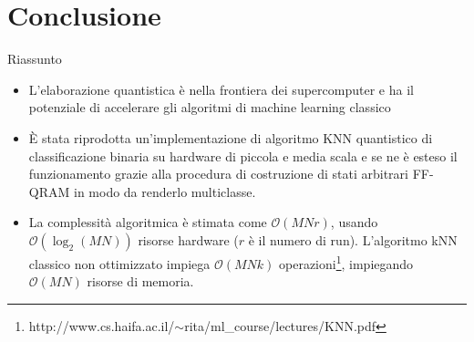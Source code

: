 \documentclass{beamer}
\begin{document}
    \section{Conclusione}

    \begin{frame}{Riassunto}
        \begin{itemize}
            \item L'elaborazione quantistica è nella frontiera dei supercomputer e ha il potenziale di accelerare gli algoritmi di machine learning classico
            \item È stata riprodotta un'implementazione di algoritmo KNN quantistico di classificazione binaria su hardware di piccola e media scala e 
            se ne è esteso il funzionamento grazie alla procedura di costruzione di stati arbitrari FF-QRAM in modo da renderlo multiclasse. 
            \item La complessità algoritmica è stimata come $\mathcal{O}(MNr)$, usando $\mathcal{O}(\log_2(MN))$ risorse hardware ($r$ è il numero di run). 
            L'algoritmo kNN classico non ottimizzato impiega $\mathcal{O}(MNk)$ operazioni\footnote{http://www.cs.haifa.ac.il/$\sim$rita/ml\_course/lectures/KNN.pdf}, impiegando $\mathcal{O}(MN)$ risorse di memoria. 
        \end{itemize}
    \end{frame}
\end{document}
